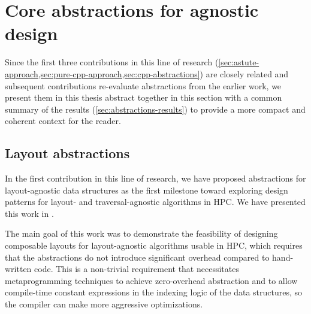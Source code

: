 




\section{Core abstractions for agnostic design}\label{sec:abstractions}

Since the first three contributions in this line of research (\cref{sec:astute-approach,sec:pure-cpp-approach,sec:cpp-abstractions}) are closely related and subsequent contributions re-evaluate abstractions from the earlier work, we present them in this thesis abstract together in this section with a common summary of the results (\cref{sec:abstractions-results}) to provide a more compact and coherent context for the reader.


\subsection{Layout abstractions}\label{sec:astute-approach}

In the first contribution in this line of research, we have proposed abstractions for layout-agnostic data structures as the first milestone toward exploring design patterns for layout- and traversal-agnostic algorithms in HPC\@. We have presented this work in .

The main goal of this work was to demonstrate the feasibility of designing composable layouts for layout-agnostic algorithms usable in HPC, which requires that the abstractions do not introduce significant overhead compared to hand-written code. This is a non-trivial requirement that necessitates metaprogramming techniques to achieve zero-overhead abstraction and to allow compile-time constant expressions in the indexing logic of the data structures, so the compiler can make more aggressive optimizations.

